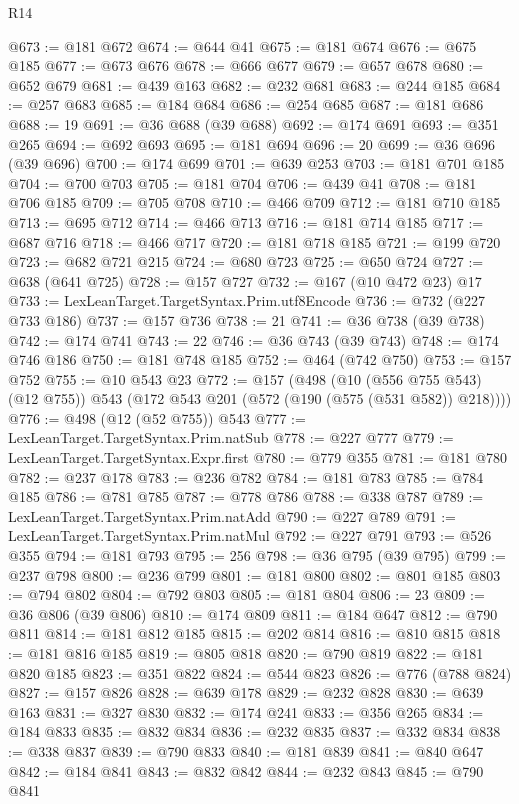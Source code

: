 \begin{lexlean}{R14}
\begin{coremodule}
@673 := @181 @672
@674 := @644 @41
@675 := @181 @674
@676 := @675 @185
@677 := @673 @676
@678 := @666 @677
@679 := @657 @678
@680 := @652 @679
@681 := @439 @163
@682 := @232 @681
@683 := @244 @185
@684 := @257 @683
@685 := @184 @684
@686 := @254 @685
@687 := @181 @686
@688 := 19
@691 := @36 @688 (@39 @688)
@692 := @174 @691
@693 := @351 @265
@694 := @692 @693
@695 := @181 @694
@696 := 20
@699 := @36 @696 (@39 @696)
@700 := @174 @699
@701 := @639 @253
@703 := @181 @701 @185
@704 := @700 @703
@705 := @181 @704
@706 := @439 @41
@708 := @181 @706 @185
@709 := @705 @708
@710 := @466 @709
@712 := @181 @710 @185
@713 := @695 @712
@714 := @466 @713
@716 := @181 @714 @185
@717 := @687 @716
@718 := @466 @717
@720 := @181 @718 @185
@721 := @199 @720
@723 := @682 @721 @215
@724 := @680 @723
@725 := @650 @724
@727 := @638 (@641 @725)
@728 := @157 @727
@732 := @167 (@10 @472 @23) @17
@733 := LexLeanTarget.TargetSyntax.Prim.utf8Encode
@736 := @732 (@227 @733 @186)
@737 := @157 @736
@738 := 21
@741 := @36 @738 (@39 @738)
@742 := @174 @741
@743 := 22
@746 := @36 @743 (@39 @743)
@748 := @174 @746 @186
@750 := @181 @748 @185
@752 := @464 (@742 @750)
@753 := @157 @752
@755 := @10 @543 @23
@772 := @157
    (@498
      (@10 (@556 @755 @543) (@12 @755))
      @543
      (@172 @543 @201 (@572 (@190 (@575 (@531 @582)) @218))))
@776 := @498 (@12 (@52 @755)) @543
@777 := LexLeanTarget.TargetSyntax.Prim.natSub
@778 := @227 @777
@779 := LexLeanTarget.TargetSyntax.Expr.first
@780 := @779 @355
@781 := @181 @780
@782 := @237 @178
@783 := @236 @782
@784 := @181 @783
@785 := @784 @185
@786 := @781 @785
@787 := @778 @786
@788 := @338 @787
@789 := LexLeanTarget.TargetSyntax.Prim.natAdd
@790 := @227 @789
@791 := LexLeanTarget.TargetSyntax.Prim.natMul
@792 := @227 @791
@793 := @526 @355
@794 := @181 @793
@795 := 256
@798 := @36 @795 (@39 @795)
@799 := @237 @798
@800 := @236 @799
@801 := @181 @800
@802 := @801 @185
@803 := @794 @802
@804 := @792 @803
@805 := @181 @804
@806 := 23
@809 := @36 @806 (@39 @806)
@810 := @174 @809
@811 := @184 @647
@812 := @790 @811
@814 := @181 @812 @185
@815 := @202 @814
@816 := @810 @815
@818 := @181 @816 @185
@819 := @805 @818
@820 := @790 @819
@822 := @181 @820 @185
@823 := @351 @822
@824 := @544 @823
@826 := @776 (@788 @824)
@827 := @157 @826
@828 := @639 @178
@829 := @232 @828
@830 := @639 @163
@831 := @327 @830
@832 := @174 @241
@833 := @356 @265
@834 := @184 @833
@835 := @832 @834
@836 := @232 @835
@837 := @332 @834
@838 := @338 @837
@839 := @790 @833
@840 := @181 @839
@841 := @840 @647
@842 := @184 @841
@843 := @832 @842
@844 := @232 @843
@845 := @790 @841

\end{coremodule}
\end{lexlean}
